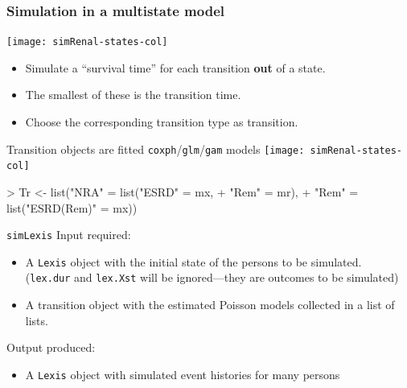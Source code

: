 \begin{frame}
   \frametitle{Simulation in a multistate model}
\vspace*{-1ex}
\texttt{[image: simRenal-states-col]}
\pause
\vspace*{-1ex}
   \begin{itemize}[<+->]
   \item Simulate a ``survival time'' for each transition
     \textbf{out} of a state.
   \item The smallest of these is the transition time.
   \item Choose the corresponding transition type as transition.
   \end{itemize}
\end{frame}

\begin{frame}[fragile]{Transition objects are fitted
    \texttt{coxph}/\texttt{glm}/\texttt{gam} models}
\vspace*{-1ex}
\texttt{[image: simRenal-states-col]}
\vspace*{-1ex}
\renewcommand{\baselinestretch}{0.8}
\small
\begin{Schunk}
\begin{Sinput}
> Tr <- list("NRA" = list("ESRD"      = mx,
+                         "Rem"       = mr),
+            "Rem" = list("ESRD(Rem)" = mx))
\end{Sinput}
\end{Schunk}
\normalsize
\renewcommand{\baselinestretch}{1.0}

\end{frame}

\begin{frame}{\texttt{simLexis}}
Input required:
   \begin{itemize}
   \item A \texttt{Lexis} object with the initial state of the
     persons to be simulated.\\
     (\texttt{lex.dur} and \texttt{lex.Xst} will be ignored---they are
     outcomes to be simulated)
 \item A transition object with the estimated Poisson models collected
   in a list of lists.
   \end{itemize}
\pause
Output produced:
\pause
\begin{itemize}
\item A \texttt{Lexis} object with simulated event histories for many
  persons
\end{itemize}

\end{frame}


